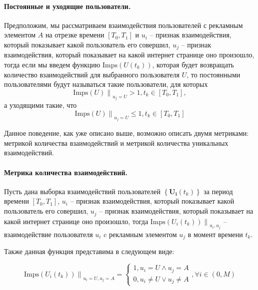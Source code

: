 \documentclass[a4paper, 14pt]{extreport}
\begin{document}
    \paragraph{Постоянные и уходящие пользователи.} Предположим, мы рассматриваем взаимодействия пользователей с
    рекламным элементом $A$ на отрезке времени $\left[ T_0, T_1 \right]$ и $u_i$ -- признак взаимодействия,
    который показывает какой пользователь его совершил, $u_j$ -- признак взаимодействия, который показывает на какой
    интернет странице оно произошло, тогда если мы введем функцию $\text{Imps}\left(U\left(t_k\right)\right)$, которая
    будет возвращать количество взаимодействий для выбранного пользователя $U$, то постоянными пользователями будут
    называться такие пользователи, для которых
    \begin{equation}
        \left.\text{Imps}\left(U\right)\right\|_{u_j = U} > 1, t_k \in \left[ T_0, T_1 \right],
    \end{equation}
    а уходящими такие, что
    \begin{equation}
        \left.\text{Imps}\left(U\right)\right\|_{u_j = U} \leq 1, t_k \in \left[ T_0, T_1 \right]
    \end{equation}

    Данное поведение, как уже описано выше, возможно описать двумя метриками: метрикой количества взаимодействий и
    метрикой количества уникальных взаимодействий.

    \paragraph{Метрика количества взаимодействий.} Пусть дана выборка взаимодействий пользователей
    $\left\{\mathbf{U_i}\left(t_k\right)\right\}$ за период времени $[T_0, T_1]$, $u_i$ -- признак взаимодействия,
    который показывает какой пользователь его совершил, $u_j$ -- признак взаимодействия, который показывает на какой
    интернет странице оно произошло, тогда $\left. \text{Imps} \left( U_i (t_k) \right) \right\|_{u_i, u_j}$ --
    взаимодействие пользователя $u_i$ c рекламным элементом $u_j$ в момент времени $t_k$.

    Также данная функция представима в следующем виде:

    \begin{equation}
        \left. \text{Imps} \left( U_i (t_k) \right) \right\|_{u_i = U, u_j = A} =
        \begin{cases}
            1, u_i = U \wedge u_j = A  \\
            0, u_i \neq U \vee u_j \neq A
        \end{cases}, \forall i \in (0, M)
    \end{equation}
\end{document}
